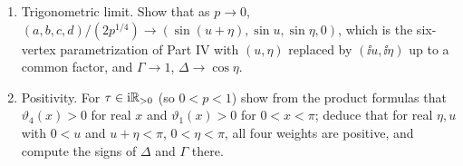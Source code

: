 \begin{exercise}
\begin{enumerate}[label=(\alph*)]
factor.  Prove $\Gamma=\dfrac{\vartheta_4(\eta)^2-\vartheta_1(\eta)^2}{\vartheta_4(\eta)^2+\vartheta_1(\eta)^2}$
directly, and
\[
 \Delta=\frac{\vartheta_2(\eta)\vartheta_3(\eta)\vartheta_4(0)^2}{\vartheta_2(0)\vartheta_3(0)\,(\vartheta_4(\eta)^2+\vartheta_1(\eta)^2)}
\]
by combining the identities (a) and (b) of the exercise on addition
identities: write $a^2+b^2-c^2-d^2$ as
$\vartheta_1(u+\eta)^2[\vartheta_4(\eta)^2\vartheta_4(u)^2-\vartheta_1(\eta)^2\vartheta_1(u)^2]
+\vartheta_4(u+\eta)^2[\vartheta_4(\eta)^2\vartheta_1(u)^2-\vartheta_1(\eta)^2\vartheta_4(u)^2]$,
factor each bracket, and use (b) at $y=\pm\eta$.  Both invariants are
independent of $u$.
\item Trigonometric limit.  Show that as $p\to0$,
$(a,b,c,d)/(2p^{1/4})\to(\sin(u+\eta),\sin u,\sin\eta,0)$, which is the
six-vertex parametrization of Part IV with $(u,\eta)$ replaced by
$(\ii u,\ii\eta)$ up to a common factor, and $\Gamma\to1$,
$\Delta\to\cos\eta$.
\item Positivity.  For $\tau\in\mathrm i\mathbb R_{>0}$ (so $0<p<1$) show from the
product formulas that $\vartheta_4(x)>0$ for real $x$ and
$\vartheta_1(x)>0$ for $0<x<\pi$; deduce that for real $\eta,u$ with
$0<u$ and $u+\eta<\pi$, $0<\eta<\pi$, all four weights are positive, and
compute the signs of $\Delta$ and $\Gamma$ there.
\end{enumerate}
\end{exercise}

